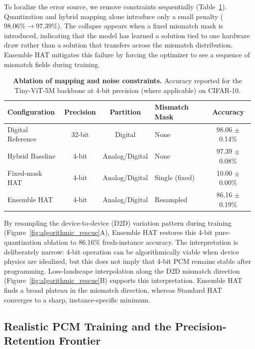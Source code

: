 To localize the error source, we remove constraints sequentially (Table~\ref{tab:ablation_mapping}). Quantization and hybrid mapping alone introduce only a small penalty ($98.06\% \rightarrow 97.39\%$). The collapse appears when a fixed mismatch mask is introduced, indicating that the model has learned a solution tied to one hardware draw rather than a solution that transfers across the mismatch distribution. Ensemble HAT mitigates this failure by forcing the optimizer to see a sequence of mismatch fields during training.

\begin{table}[htbp]
\centering
\caption{\textbf{Ablation of mapping and noise constraints.} Accuracy reported for the Tiny-ViT-5M backbone at 4-bit precision (where applicable) on CIFAR-10.}
\label{tab:ablation_mapping}
\begin{tabular}{lcclc}
\toprule
\textbf{Configuration} & \textbf{Precision} & \textbf{Partition} & \textbf{Mismatch Mask} & \textbf{Accuracy} \\
\midrule
Digital Reference & 32-bit & Digital & None & 98.06 $\pm$ 0.14\% \\
Hybrid Baseline & 4-bit & Analog/Digital & None & 97.39 $\pm$ 0.08\% \\
Fixed-mask HAT & 4-bit & Analog/Digital & Single (fixed) & 10.00 $\pm$ 0.00\% \\
Ensemble HAT & 4-bit & Analog/Digital & Resampled & 86.16 $\pm$ 0.19\% \\
\bottomrule
\end{tabular}
\end{table}

By resampling the device-to-device (D2D) variation pattern during training (Figure~\ref{fig:algorithmic_rescue}A), Ensemble HAT restores this 4-bit pure-quantization ablation to 86.16\% fresh-instance accuracy. The interpretation is deliberately narrow: 4-bit operation can be algorithmically viable when device physics are idealized, but this does not imply that 4-bit PCM remains stable after programming. Loss-landscape interpolation along the D2D mismatch direction (Figure~\ref{fig:algorithmic_rescue}B) supports this interpretation. Ensemble HAT finds a broad plateau in the mismatch direction, whereas Standard HAT converges to a sharp, instance-specific minimum.

\subsection{Realistic PCM Training and the Precision-Retention Frontier}
\label{subsec:pcm-precision-ladder}

